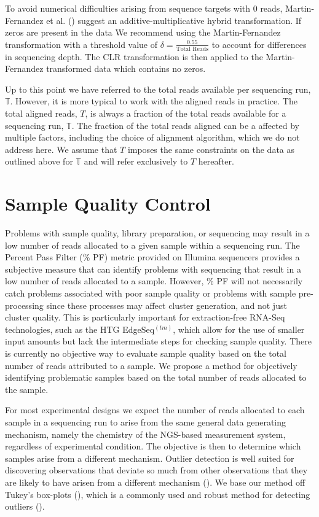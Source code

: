 \documentclass [10pt]{article}
\theoremstyle{definition}
\begin{document}
To avoid numerical difficulties arising from sequence targets with 0 reads, Martin-Fernandez et al. (\citeyear{Martin-Fernandez2000}) suggest an additive-multiplicative hybrid transformation.  If zeros are present in the data We recommend using the Martin-Fernandez transformation with a threshold value of $\delta = \frac{0.55}{\text{Total Reads}}$ to account for differences in sequencing depth.  The CLR transformation is then applied to the Martin-Fernandez transformed data which contains no zeros. 




Up to this point we have referred to the total reads available per sequencing run, $\mathbb{T}$.  However, it is more typical to work with the aligned reads in practice.  The total aligned reads, $T$, is always a fraction of the total reads available for a sequencing run, $\mathbb{T}$.  The fraction of the total reads aligned can be a affected by multiple factors, including the choice of alignment algorithm, which we do not address here.  We assume that $T$ imposes the same constraints on the data as outlined above for $\mathbb{T}$ and will refer exclusively to $T$ hereafter.  


\section{Sample Quality Control}
Problems with sample quality, library preparation, or sequencing may result in a low number of reads allocated to a given sample within a sequencing run.  The Percent Pass Filter (\% PF) metric provided on Illumina sequencers provides a subjective measure that can identify problems with sequencing that result in a low number of reads allocated to a sample.  However, \% PF will not necessarily catch problems associated with poor sample quality or problems with sample pre-processing since these processes may affect cluster generation, and not just cluster quality.  This is particularly important for extraction-free RNA-Seq technologies, such as the HTG EdgeSeq$^{(tm)}$, which allow for the use of smaller input amounts but lack the intermediate steps for checking sample quality.  There is currently no objective way to evaluate sample quality based on the total number of reads attributed to a sample. We propose a method for objectively identifying problematic samples based on the total number of reads allocated to the sample. 

For most experimental designs we expect the number of reads allocated to each sample in a sequencing run to arise from the same general data generating mechanism, namely the chemistry of the NGS-based measurement system, regardless of experimental condition.  The objective is then to determine which samples arise from a different mechanism.  Outlier detection is well suited for discovering observations that deviate so much from other observations that they are likely to have arisen from a different mechanism (\cite{Hawkins1980}).  We base our method off Tukey's box-plots (\cite{Tukey1977}), which is a commonly used and robust method for detecting outliers (\cite{Ben-Gal2009}).
\end{document}
